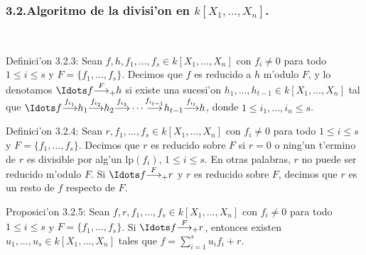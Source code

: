 \documentclass[10pt]{beamer}
\renewcommand{\lp}{\text{lp}}
\begin{document}
\begin{frame}
\frametitle{3.2.Algoritmo de la divisi'on en $k[X_1,...,X_n]$.}\\
\begin{block}{Definici'on 3.2.3:}
Sean $f,h,f_1,...,f_s \in k[X_1,...,X_n]$ con $f_i \not = 0$ para todo $1 \leq i \leq s$ y $F=\{f_1,...,f_s\}$. Decimos que $f$ es reducido a $h$ m'odulo $F$, y lo denotamos $\displaystyle \Idots f {\overset{F}{\longrightarrow}}_{+} h$ si existe una sucesi'on $h_1,...,h_{t-1} \in k[X_1,...,X_n]$ tal que ${\displaystyle \Idots f {\overset{f_{i_1}}{\longrightarrow}} h_1 {\overset{f_{i_2}}{\longrightarrow}} h_2 {\overset{f_{i_3}}{\longrightarrow}} \cdots {\overset{f_{i_{t-1}}}{\longrightarrow}} h_{t-1} {\overset{f_{i_t}}{\longrightarrow}} h}$, donde $1 \leq i_1,...,i_n \leq s$.\\
\end{block}
\begin{block}{Definici'on 3.2.4:}
Sean $r,f_1,...,f_s \in k[X_1,...,X_n]$ con $f_i \not = 0$ para todo $1 \leq i \leq s$ y $F=\{f_1,...,f_s\}$. Decimos que $r$ es reducido sobre $F$ si $r=0$ o ning'un t'ermino de $r$ es divisible por alg'un $\lp(f_i)$, $1 \leq i \leq s$. En otras palabras, $r$ no puede ser reducido m'odulo $F$. Si $\displaystyle \Idots f {\overset{F}{\longrightarrow}}_{+} r$ y $r$ es reducido sobre $F$, decimos que $r$ es un resto de $f$ respecto de $F$.\\
\end{block}
\begin{block}{Proposici'on 3.2.5:}
Sean $f,r,f_1,...,f_s \in k[X_1,...,X_n]$ con $f_i \not = 0$ para todo $1 \leq i \leq s$ y $F=\{f_1,...,f_s\}$. Si $\displaystyle \Idots f {\overset{F}{\longrightarrow}}_{+} r$, entonces existen $u_1,...,u_s \in k[X_1,...,X_n]$ tales que $f= \sum^{s}_{i=1}{u_if_i}+r$.\\
\end{block}
\vspace{5cm}
\end{frame}
\end{document}
